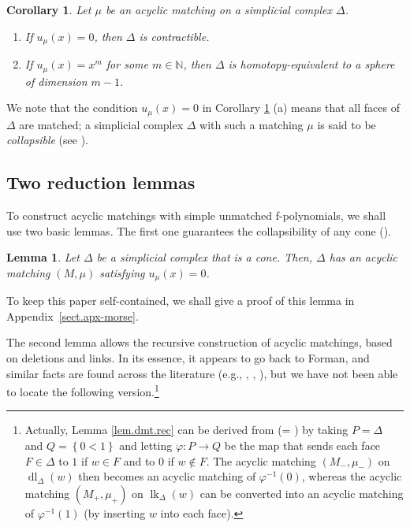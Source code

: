 \documentclass[12pt]{amsart}
\newtheorem{lemma}[theorem]{Lemma}
\newtheorem{corollary}[theorem]{Corollary}
\theoremstyle{definition}
\DeclareMathOperator{\lk}{lk}
\DeclareMathOperator{\dl}{dl}
\begin{document}
\begin{corollary}
\label{cor.dmt.hteq}Let $\mu$ be an acyclic matching on a simplicial complex
$\Delta$.

\begin{enumerate}
\item[(a)] If $u_{\mu}\left(  x\right)  =0$, then $\Delta$ is contractible.

\item[(b)] If $u_{\mu}\left(  x\right)  =x^{m}$ for some $m\in\mathbb{N}$,
then $\Delta$ is homotopy-equivalent to a sphere of dimension $m-1$.
\end{enumerate}
\end{corollary}

We note that the condition $u_{\mu}\left(  x\right)  =0$ in Corollary
\ref{cor.dmt.hteq} (a) means that all faces of $\Delta$ are matched; a
simplicial complex $\Delta$ with such a matching $\mu$ is said to be
\emph{collapsible} (see \cite[Theorem 6.4]{Forman-user}).

\subsection{Two reduction lemmas}

To construct acyclic matchings with simple unmatched f-polynomials, we shall
use two basic lemmas. The first one guarantees the collapsibility of any cone
(\cite[Proposition 10.11]{Kozlov20}).

\begin{lemma}
\label{lem.dmt.cone}
Let $\Delta$ be a simplicial complex that is a cone. Then,
$\Delta$ has an acyclic matching $\left(  M,\mu\right)  $ satisfying $u_{\mu
}\left(  x\right)  =0$.
\end{lemma}

To keep this paper self-contained, we shall give a proof of this lemma
in Appendix~\ref{sect.apx-morse}.


The second lemma allows the recursive construction of acyclic matchings, based
on deletions and links. In its essence, it appears to go back to Forman, and
similar facts are found across the literature (e.g., \cite[Proposition
10.13]{Kozlov20}, \cite[Lemma 2.4]{Engstrom08}, \cite[Theorem 11.10]%
{Kozlov-CAT}), but we have not been able to locate the following
version.\footnote{Actually, Lemma \ref{lem.dmt.rec} can be derived from
\cite[Theorem 11.10]{Kozlov-CAT} (= \cite[Theorem 16.8]{Kozlov20})
by taking $P=\Delta$ and $Q=\left\{
0<1\right\}  $ and letting $\varphi:P\rightarrow Q$ be the map that sends each
face $F\in\Delta$ to $1$ if $w\in F$ and to $0$ if $w\notin F$. The acyclic
matching $\left(  M_-,\mu_-\right)  $ on $\dl_{\Delta}\left(  w\right)  $
then becomes an acyclic matching of
$\varphi^{-1}\left(  0\right)  $, whereas the acyclic matching $\left(
M_+,\mu_+\right)  $ on $\lk_{\Delta}\left(
w\right)  $ can be converted into an acyclic matching of $\varphi^{-1}\left(
1\right)  $ (by inserting $w$ into each face).}
\end{document}
